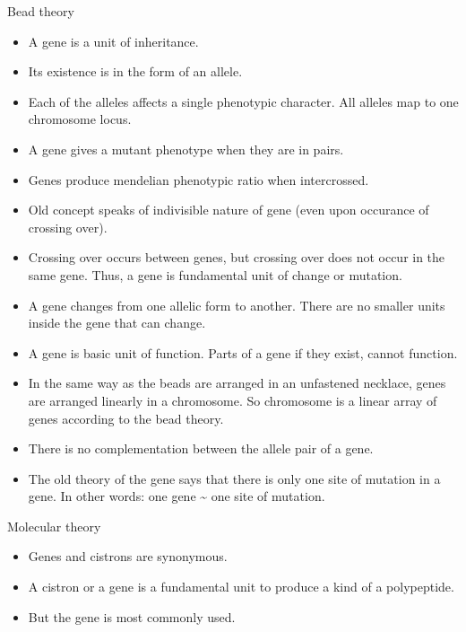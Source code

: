 \documentclass[11pt,dvipsnames,ignorenonframetext,aspectratio=169]{beamer}
\providecommand{\tightlist}{%
  \setlength{\itemsep}{0pt}\setlength{\parskip}{0pt}}
\begin{document}
\begin{frame}{Bead theory}
\protect\hypertarget{bead-theory}{}

\begin{itemize}
\tightlist
\item
  A gene is a unit of inheritance.
\item
  Its existence is in the form of an allele.
\item
  Each of the alleles affects a single phenotypic character. All alleles
  map to one chromosome locus.
\item
  A gene gives a mutant phenotype when they are in pairs.
\item
  Genes produce mendelian phenotypic ratio when intercrossed.
\item
  Old concept speaks of indivisible nature of gene (even upon occurance
  of crossing over).
\item
  Crossing over occurs between genes, but crossing over does not occur
  in the same gene. Thus, a gene is fundamental unit of change or
  mutation.
\end{itemize}

\end{frame}

\begin{frame}{}
\protect\hypertarget{section-27}{}

\begin{itemize}
\tightlist
\item
  A gene changes from one allelic form to another. There are no smaller
  units inside the gene that can change.
\item
  A gene is basic unit of function. Parts of a gene if they exist,
  cannot function.
\item
  In the same way as the beads are arranged in an unfastened necklace,
  genes are arranged linearly in a chromosome. So chromosome is a linear
  array of genes according to the bead theory.
\item
  There is no complementation between the allele pair of a gene.
\item
  The old theory of the gene says that there is only one site of
  mutation in a gene. In other words: one gene \textasciitilde{} one
  site of mutation.
\end{itemize}

\end{frame}

\begin{frame}{Molecular theory}
\protect\hypertarget{molecular-theory}{}

\begin{itemize}
\tightlist
\item
  Genes and cistrons are synonymous.
\item
  A cistron or a gene is a fundamental unit to produce a kind of a
  polypeptide.
\item
  But the gene is most commonly used.
\end{itemize}

\end{frame}
\end{document}
